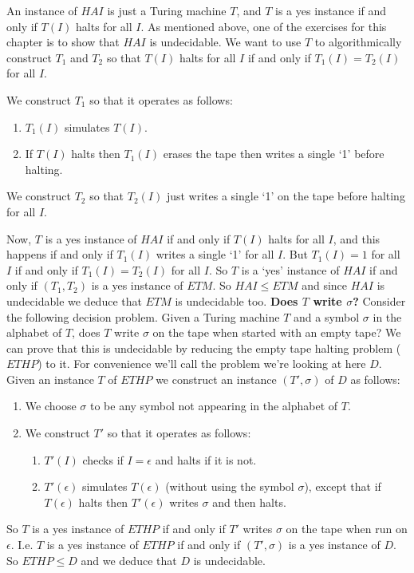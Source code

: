 \documentclass{article}
\theoremstyle{plain}
\theoremstyle{definition}
\begin{document}
An instance of $HAI$ is just a Turing machine $T$, and $T$ is a yes instance if and only if $T(I)$ halts for all $I$. As mentioned above, one of the exercises for this chapter is to show that $HAI$ is undecidable. We want to use $T$ to algorithmically construct $T_1$ and $T_2$ so that $T(I)$ halts for all $I$ if and only if $T_1(I)=T_2(I)$ for all $I$. 

We construct $T_1$ so that it operates as follows:
\begin{enumerate}
\item $T_1(I)$ simulates $T(I)$.
\item If $T(I)$ halts then $T_1(I)$ erases the tape then writes a single `1' before halting. 
\end{enumerate} 

We construct $T_2$ so that $T_2(I)$ just writes a single `1' on the tape before halting for all $I$.

Now, $T$ is a yes instance of $HAI$ if and only if $T(I)$ halts for all $I$, and this happens if and only if $T_1(I)$ writes a single `1' for all $I$. But $T_1(I)=1$ for all $I$ if and only if $T_1(I)=T_2(I)$ for all $I$. So $T$ is a `yes' instance of $HAI$ if and only if $(T_1,T_2)$ is a yes instance of $ETM$. So $HAI\leq ETM$ and since $HAI$ is undecidable we deduce that $ETM$ is undecidable too.
\newline
\newline
\textbf{Does $T$ write $\sigma$?}\newline
Consider the following decision problem. Given a Turing machine $T$ and a symbol $\sigma$ in the alphabet of $T$, does $T$ write $\sigma$ on the tape when started with an empty tape? We can prove that this is undecidable by reducing the empty tape halting problem ($ETHP$) to it. For convenience we'll call the problem we're looking at here $D$. Given an instance $T$ of $ETHP$ we construct an instance $(T',\sigma)$ of $D$ as follows:
\begin{enumerate}
\item We choose $\sigma$ to be any symbol not appearing in the alphabet of $T$.
\item We construct $T'$ so that it operates as follows:
\begin{enumerate}
\item $T'(I)$ checks if $I=\epsilon$ and halts if it is not.
\item $T'(\epsilon)$ simulates $T(\epsilon)$ (without using the symbol $\sigma$), except that if $T(\epsilon)$ halts then $T'(\epsilon)$ writes $\sigma$ and then halts. 
\end{enumerate}
\end{enumerate}
So $T$ is a yes instance of $ETHP$ if and only if $T'$ writes $\sigma$ on the tape when run on $\epsilon$. I.e. $T$ is a yes instance of $ETHP$ if and only if $(T',\sigma)$ is a yes instance of $D$. So $ETHP\leq D$ and we deduce that $D$ is undecidable.
\end{document}
